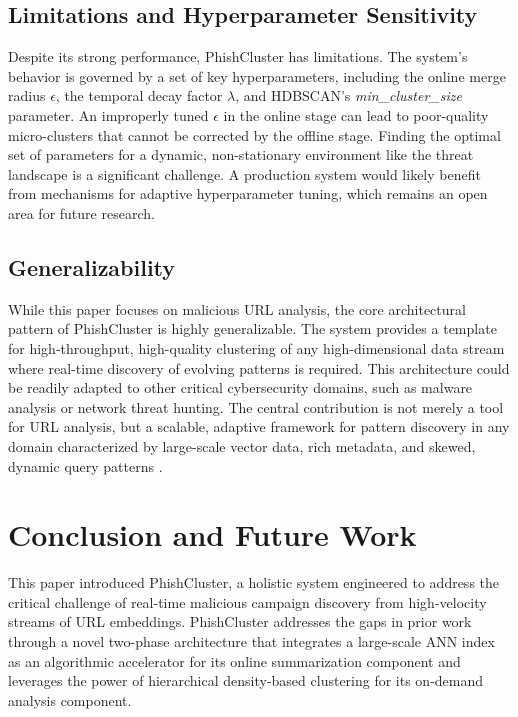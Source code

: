 \documentclass[journal,article,submit,pdftex,moreauthors]{Definitions/mdpi}
\begin{document}
\subsection{Limitations and Hyperparameter Sensitivity}

Despite its strong performance, PhishCluster has limitations. The system's behavior is governed by a set of key hyperparameters, including the online merge radius $\epsilon$, the temporal decay factor $\lambda$, and HDBSCAN's \textit{min\_cluster\_size} parameter. An improperly tuned $\epsilon$ in the online stage can lead to poor-quality micro-clusters that cannot be corrected by the offline stage. Finding the optimal set of parameters for a dynamic, non-stationary environment like the threat landscape is a significant challenge. A production system would likely benefit from mechanisms for adaptive hyperparameter tuning, which remains an open area for future research.

\subsection{Generalizability}

While this paper focuses on malicious URL analysis, the core architectural pattern of PhishCluster is highly generalizable. The system provides a template for high-throughput, high-quality clustering of any high-dimensional data stream where real-time discovery of evolving patterns is required. This architecture could be readily adapted to other critical cybersecurity domains, such as malware analysis or network threat hunting. The central contribution is not merely a tool for URL analysis, but a scalable, adaptive framework for pattern discovery in any domain characterized by large-scale vector data, rich metadata, and skewed, dynamic query patterns \cite{ref_subramanya, ref_wang_nhq, ref_mohoney}.

\section{Conclusion and Future Work}

This paper introduced PhishCluster, a holistic system engineered to address the critical challenge of real-time malicious campaign discovery from high-velocity streams of URL embeddings. PhishCluster addresses the gaps in prior work through a novel two-phase architecture that integrates a large-scale ANN index as an algorithmic accelerator for its online summarization component and leverages the power of hierarchical density-based clustering for its on-demand analysis component.
\end{document}
